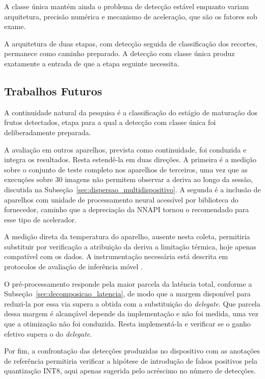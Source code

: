 \documentclass[artigo,times,capa]{iftex2024}
\begin{document}
A classe única mantém ainda o problema de detecção estável enquanto
variam arquitetura, precisão numérica e mecanismo de aceleração, que são os
fatores sob exame.

A arquitetura de duas etapas, com detecção seguida de classificação dos recortes, permanece como caminho preparado. A detecção com classe única produz exatamente a entrada de que a etapa seguinte necessita.

\subsection{Trabalhos Futuros}

A continuidade natural da pesquisa é a classificação do estágio de maturação dos frutos detectados, etapa para a qual a detecção com classe única foi deliberadamente preparada.

A avaliação em outros aparelhos, prevista como continuidade, foi conduzida e integra os resultados. Resta estendê-la em duas direções. A primeira é a medição sobre o conjunto de teste completo nos aparelhos de terceiros, uma vez que as execuções sobre 30 imagens não permitem observar a deriva ao longo da sessão, discutida na Subseção~\ref{sec:dispersao_multidispositivo}. A segunda é a inclusão de aparelhos com unidade de processamento neural acessível por biblioteca do fornecedor, caminho que a depreciação da \ac{NNAPI} tornou o recomendado para esse tipo de acelerador.

A medição direta da temperatura do aparelho, ausente nesta coleta, permitiria substituir por verificação a atribuição da deriva a limitação térmica, hoje apenas compatível com os dados. A instrumentação necessária está descrita em protocolos de avaliação de inferência móvel \cite{Li2024Benchmark}.

O pré-processamento responde pela maior parcela da latência total, conforme a Subseção~\ref{sec:decomposicao_latencia}, de modo que a margem disponível para reduzi-la por essa via supera a obtida com a substituição do \textit{delegate}. Que parcela dessa margem é alcançável depende da implementação e não foi medida, uma vez que a otimização não foi conduzida. Resta implementá-la e verificar se o ganho efetivo supera o do \textit{delegate}.

Por fim, a confrontação das detecções produzidas no dispositivo com as anotações de referência permitiria verificar a hipótese de introdução de falsos positivos pela quantização \ac{INT8}, aqui apenas sugerida pelo acréscimo no número de detecções.
\end{document}
